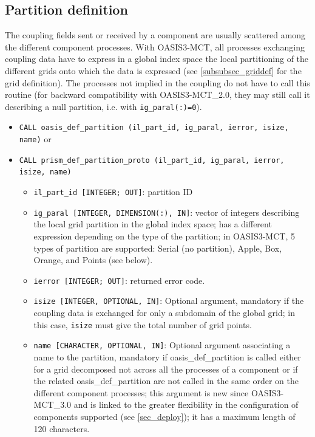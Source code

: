 \subsection{Partition definition}
\label{subsubsec_Partition}

The coupling fields sent or received by a component are usually
scattered among the different component processes. With OASIS3-MCT,
all processes exchanging coupling data have to express in a global index space the local
partitioning of the different grids onto which the data is expressed (see \ref{subsubsec_griddef} for the grid definition).
The processes not implied in the
coupling do not have to call this routine (for backward compatibility with OASIS3-MCT\_2.0,
they may still call it describing a null partition, i.e. with {\tt ig\_paral(:)=0}).

\begin{itemize}

  \vspace{0.2cm}
\item {\tt CALL oasis\_def\_partition (il\_part\_id, ig\_paral,
    ierror, isize, name)} or
\item {\tt CALL prism\_def\_partition\_proto (il\_part\_id, ig\_paral,
    ierror, isize, name)}

  \begin{itemize}
  \item {\tt il\_part\_id [INTEGER; OUT]}: partition ID
  \item {\tt ig\_paral [INTEGER, DIMENSION(:), IN]}: vector of
    integers describing the local grid partition in the global index space;
    has a different expression depending on the type of the partition;
    in OASIS3-MCT, 5 types of partition are supported: Serial (no
    partition), Apple, Box, Orange, and Points (see below).
  \item {\tt ierror [INTEGER; OUT]}: returned error code.
  \item {\tt isize [INTEGER, OPTIONAL, IN]}: Optional argument, mandatory
    if the coupling data is exchanged for only a subdomain of the
    global grid; in this case, {\tt isize} must give the total number of grid points.

  \item {\tt name [CHARACTER, OPTIONAL, IN]}: Optional argument associating a name to the partition,
    mandatory if oasis\_def\_partition is called either for a grid
    decomposed not across all the processes of a component or if the related
    oasis\_def\_partition are not
    called in the same order on the different component processes;
    this argument is new since OASIS3-MCT\_3.0 and is linked to the
    greater flexibility in the configuration of components supported
    (see \ref{sec_deploy}); it has a maximum length of 120 characters. 
  \end{itemize}
\end{itemize}

